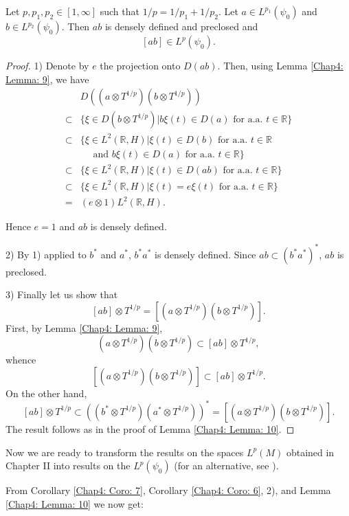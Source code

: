 \begin{lemma}
    Let $p,p_1,p_2\in [1,\infty]$ such that $1/p = 1/p_1 + 1/p_2$. Let $a\in L^{p_1}(\psi_0)$ and $b \in L^{p_2}(\psi_0)$. Then $ab$ is densely defined and preclosed and
    \[
        [ab]\in L^p(\psi_0).
    \]
\end{lemma}
\begin{proof}
    1) Denote by $e$ the projection onto $D(ab)$. Then, using Lemma \ref{Chap4: Lemma: 9}, we have
    \[
        \begin{split}
            &D((a\otimes T^{1/p})(b\otimes T^{1/p}))\\
            \subset& \{\xi\in D(b\otimes T^{1/p})|b\xi(t)\in D(a) \text{ for a.a. }t\in \mathbb{R}\}\\
            \subset& \{\xi\in L^2(\mathbb{R},H)|\xi(t)\in D(b) \text{ for a.a. }t\in \mathbb{R}\\
            &\quad \text{ and } b\xi(t)\in D(a) \text{ for a.a. }t\in \mathbb{R}\}\\
            \subset& \{\xi\in L^2(\mathbb{R},H)|\xi(t)\in D(ab) \text{ for a.a. }t\in \mathbb{R}\}\\
            \subset& \{\xi\in L^2(\mathbb{R},H)|\xi(t)=e\xi(t) \text{ for a.a. }t\in \mathbb{R}\}\\
            =&(e\otimes 1)L^2(\mathbb{R},H).
        \end{split}
    \]

    Hence $e = 1$ and $ab$ is densely defined. \par
    2) By 1) applied to $b^*$ and $a^*$, $b^*a^*$ is densely defined. Since $ab\subset (b^*a^*)^*$, $ab$ is preclosed.\par
    3) Finally let us show that
    \[
        [ab]\otimes T^{1/p}=[(a\otimes T^{1/p})(b\otimes T^{1/p})].
    \]
    First, by Lemma \ref{Chap4: Lemma: 9},
    \[
        (a\otimes T^{1/p})(b\otimes T^{1/p})\subset [ab]\otimes T^{1/p},
    \]
    whence
    \[
        [(a\otimes T^{1/p})(b\otimes T^{1/p})] \subset [ab]\otimes T^{1/p}.
    \]
    On the other hand,
    \[
        [ab]\otimes T^{1/p}\subset ((b^*\otimes T^{1/p})(a^*\otimes T^{1/p}))^*=[(a\otimes T^{1/p})(b\otimes T^{1/p})].
    \]
    The result follows as in the proof of Lemma \ref{Chap4: Lemma: 10}.
\end{proof}
Now we are ready to transform the results on the spaces $L^p(M)$ obtained in Chapter II into results on the $L^p(\psi_0)$ (for an alternative, see \cite{10}). \par
From Corollary \ref{Chap4: Coro: 7}, Corollary \ref{Chap4: Coro: 6}, 2), and Lemma \ref{Chap4: Lemma: 10} we now get:
